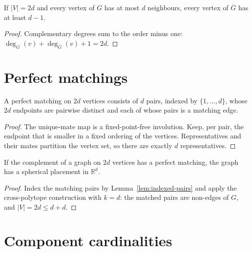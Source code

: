 \begin{lemma}
  \label{lem:complement-degree}
  \leanok
  If $|V| = 2d$ and every vertex of $G$ has at most $d$ neighbours, every vertex of
  $\overline{G}$ has at least $d - 1$.
\end{lemma}
\begin{proof}
  Complementary degrees sum to the order minus one:
  $\deg_G(v) + \deg_{\overline{G}}(v) + 1 = 2d$.
\end{proof}

\section{Perfect matchings}

\begin{lemma}
  \label{lem:indexed-pairs}
  \leanok
  A perfect matching on $2d$ vertices consists of $d$ pairs, indexed by
  $\{1, \dots, d\}$, whose $2d$ endpoints are pairwise distinct and each of whose pairs is
  a matching edge.
\end{lemma}
\begin{proof}
  The unique-mate map is a fixed-point-free involution. Keep, per pair, the endpoint that
  is smaller in a fixed ordering of the vertices. Representatives and their mates partition
  the vertex set, so there are exactly $d$ representatives.
\end{proof}

\begin{lemma}
  \label{lem:placement-matching}
  \leanok
  If the complement of a graph on $2d$ vertices has a perfect matching, the graph has a
  spherical placement in $\mathbb{R}^d$.
\end{lemma}
\begin{proof}
  Index the matching pairs by Lemma~\ref{lem:indexed-pairs} and apply the cross-polytope
  construction with $k = d$: the matched pairs are non-edges of $G$, and
  $|V| = 2d \le d + d$.
\end{proof}

\section{Component cardinalities}

